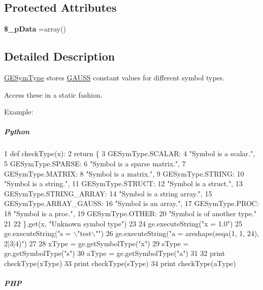 \subsection*{Protected Attributes}
\begin{DoxyCompactItemize}
\item 
\hypertarget{class_g_e_sym_type_a9b0e005f3a1d676ea145af696a3ac28f}{{\bfseries \$\-\_\-p\-Data} =array()}\label{class_g_e_sym_type_a9b0e005f3a1d676ea145af696a3ac28f}

\end{DoxyCompactItemize}


\subsection{Detailed Description}
\hyperlink{class_g_e_sym_type}{G\-E\-Sym\-Type} stores \hyperlink{class_g_a_u_s_s}{G\-A\-U\-S\-S} constant values for different symbol types. 

Access these in a static fashion.

Example\-:

\subparagraph*{Python}


\begin{DoxyCode}
1 \textcolor{keyword}{def }checkType(x):
2     \textcolor{keywordflow}{return} \{
3         GESymType.SCALAR:
4             \textcolor{stringliteral}{"Symbol is a scalar."},
5         GESymType.SPARSE:
6             \textcolor{stringliteral}{"Symbol is a sparse matrix."},
7         GESymType.MATRIX:
8             \textcolor{stringliteral}{"Symbol is a matrix."},
9         GESymType.STRING:
10             \textcolor{stringliteral}{"Symbol is a string."},
11         GESymType.STRUCT:
12             \textcolor{stringliteral}{"Symbol is a struct."},
13         GESymType.STRING\_ARRAY:
14             \textcolor{stringliteral}{"Symbol is a string array."},
15         GESymType.ARRAY\_GAUSS:
16             \textcolor{stringliteral}{"Symbol is an array."},
17         GESymType.PROC:
18             \textcolor{stringliteral}{"Symbol is a proc."},
19         GESymType.OTHER:
20             \textcolor{stringliteral}{"Symbol is of another type."}
21 
22         \}.get(x, \textcolor{stringliteral}{"Unknown symbol type"})
23 
24 ge.executeString(\textcolor{stringliteral}{"x = 1.0"})
25 ge.executeString(\textcolor{stringliteral}{"s = \(\backslash\)"test\(\backslash\)""})
26 ge.executeString(\textcolor{stringliteral}{"a = areshape(seqa(1, 1, 24), 2|3|4)"})
27 
28 xType = ge.getSymbolType(\textcolor{stringliteral}{"x"})
29 sType = ge.getSymbolType(\textcolor{stringliteral}{"s"})
30 aType = ge.getSymbolType(\textcolor{stringliteral}{"a"})
31 
32 \textcolor{keywordflow}{print} checkType(xType)
33 \textcolor{keywordflow}{print} checkType(sType)
34 \textcolor{keywordflow}{print} checkType(aType)
\end{DoxyCode}
 \subparagraph*{P\-H\-P}


